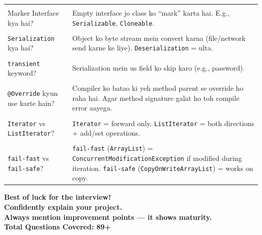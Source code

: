 \documentclass[12pt,a4paper]{article}
\begin{document}
\begin{center}
\begin{tcolorbox}[colback=answerbox, colframe=primaryblue, title={\large\bfseries Rapid Fire --- 1-Line Answers}, fonttitle=\color{white}, coltitle=white, width=\textwidth, breakable]
\begin{tabular}{p{7cm} p{7cm}}
\hline \\
Marker Interface kya hai? & Empty interface jo class ko ``mark'' karta hai. E.g., \texttt{Serializable}, \texttt{Cloneable}. \\[5pt]
\hline \\
\texttt{Serialization} kya hai? & Object ko byte stream mein convert karna (file/network send karne ke liye). \texttt{Deserialization} = ulta. \\[5pt]
\hline \\
\texttt{transient} keyword? & Serialization mein us field ko skip karo (e.g., password). \\[5pt]
\hline \\
\texttt{@Override} kyun use karte hain? & Compiler ko batao ki yeh method parent se override ho raha hai. Agar method signature galat ho toh compile error aayega. \\[5pt]
\hline \\
\texttt{Iterator} vs \texttt{ListIterator}? & \texttt{Iterator} = forward only. \texttt{ListIterator} = both directions + add/set operations. \\[5pt]
\hline \\
\texttt{fail-fast} vs \texttt{fail-safe}? & \texttt{fail-fast} (\texttt{ArrayList}) = \texttt{ConcurrentModificationException} if modified during iteration. \texttt{fail-safe} (\texttt{CopyOnWriteArrayList}) = works on copy. \\[5pt]
\end{tabular}

\end{tcolorbox}
\end{center}

\vspace{1cm}

\begin{center}
\begin{tcolorbox}[colback=tipbox, colframe=accentgreen, width=12cm]
\centering
\Large\bfseries Best of luck for the interview! \\[5pt]
\normalsize Confidently explain your project. \\
Always mention improvement points --- it shows maturity. \\[5pt]
\small Total Questions Covered: \textbf{89+}
\end{tcolorbox}
\end{center}
\end{document}
